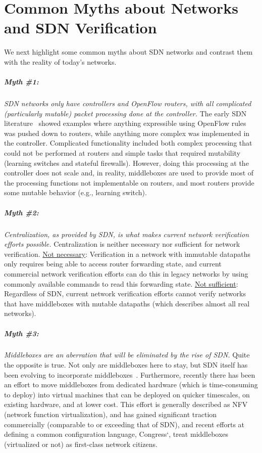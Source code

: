 \section{Common Myths about Networks and SDN Verification}

We next highlight some common myths about SDN networks and contrast them with the reality of today's networks.


\subparagraph*{Myth \#1:} \emph{SDN networks only have controllers and OpenFlow routers, with all complicated (particularly mutable) packet processing done at the controller.} The early SDN literature~\cite{gude2008nox, monsanto2013composing} showed examples where anything expressible using OpenFlow rules was pushed down to routers, while anything more complex was implemented in the controller. Complicated functionality included both complex processing that could not be performed at routers and simple tasks that required mutability (\eg learning switches and stateful firewalls). However, doing this processing at the controller does not scale and, in reality, middleboxes are used to provide most of the processing functions not implementable on routers, and most routers provide some mutable behavior (e.g., learning switch).

\subparagraph*{Myth \#2:} \emph{Centralization, as provided by SDN, is what makes current network verification efforts possible.} Centralization is neither necessary nor sufficient for network verification. {\underline{Not necessary}:} Verification in a network with immutable datapaths only requires being able to access router forwarding state, and current commercial network verification efforts can do this in legacy networks by using commonly available commands to read this forwarding state. {\underline{Not sufficient}:} Regardless of SDN, current network verification efforts cannot verify networks that have middleboxes with mutable datapaths (which describes almost all real networks).


\subparagraph*{Myth \#3:} \emph{Middleboxes are an aberration that will be eliminated by the rise of SDN.} Quite the opposite is true. Not only are middleboxes here to stay, but SDN itself has been evolving to incorporate middleboxes~\cite{scottI2talk}. Furthermore, recently there has been an effort to move middleboxes from dedicated hardware (which is time-consuming to deploy) into virtual machines that can be deployed on quicker timescales, on existing hardware, and at lower cost. This effort is generally described as NFV (network function virtualization), and has gained significant traction commercially (comparable to or exceeding that of SDN), and recent efforts at defining a common configuration language, \eg Congress`\cite{congress}, treat middleboxes (virtualized or not) as first-class network citizens.


